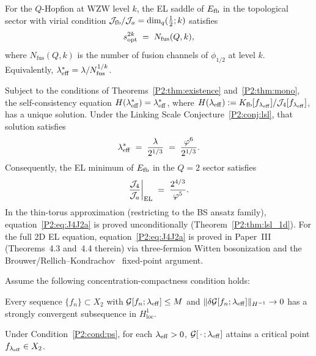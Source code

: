 \begin{conjecture}
\label{P1:conj:linking}
For the $Q$-Hopfion at WZW level $k$, the EL saddle of $E_{\mathrm{fb}}$
in the topological sector with virial condition
$\mathcal{J}_{\mathrm{fb}}/\mathcal{J}_a = \dim_q(\tfrac{1}{2};k)$ satisfies
\begin{equation}
  s_{\mathrm{opt}}^{2k} \;=\; N_{\mathrm{fus}}(Q,k),
  \label{P1:eq:lsc_p1}
\end{equation}
where $N_{\mathrm{fus}}(Q,k)$ is the number of fusion channels of
$\phi_{1/2}$ at level $k$.
Equivalently, $\lambda_{\mathrm{eff}}^* = \lambda/N_{\mathrm{fus}}^{1/k}$.
\end{conjecture}

\begin{theorem}
\label{P2:thm:main}
Subject to the conditions of Theorems~\ref{P2:thm:existence}
and~\ref{P2:thm:mono}, the self-consistency equation $H(\lambda_{\mathrm{eff}}^*)=\lambda_{\mathrm{eff}}^*$,
where $H(\lambda_{\mathrm{eff}}):=K_{\mathrm{fb}}[f_{\lambda_{\mathrm{eff}}}]/\mathcal{J}_4[f_{\lambda_{\mathrm{eff}}}]$, has a unique solution.
Under the Linking Scale Conjecture~\ref{P2:conj:lsl}, that solution satisfies
\begin{equation}
  \lambda_{\mathrm{eff}}^* \;=\; \frac{\lambda}{2^{1/3}} \;=\; \frac{\varphi^6}{2^{1/3}}.
  \label{P2:eq:leffstar}
\end{equation}
Consequently, the EL minimum of $E_{\mathrm{fb}}$ in the $Q=2$ sector satisfies
\begin{equation}
  \frac{\mathcal{J}_4}{\mathcal{J}_a}\bigg|_{\mathrm{EL}}
  \;=\; \frac{2^{4/3}}{\varphi^5}.
  \label{P2:eq:J4J2a}
\end{equation}
In the thin-torus approximation (restricting to the BS ansatz family),
equation~\eqref{P2:eq:J4J2a} is proved unconditionally
(Theorem~\ref{P2:thm:lsl_1d}).
For the full 2D EL equation, equation~\eqref{P2:eq:J4J2a} is proved
in Paper~III~\cite{Paper3} (Theorems~4.3 and~4.4 therein) via
three-fermion Witten bosonization and the Brouwer/Rellich--Kondrachov~\cite{Evans2010}
fixed-point argument.
\end{theorem}

\begin{theorem}
\label{P2:thm:existence}
Assume the following concentration-compactness condition holds:
\begin{condition}
\label{P2:cond:ps}
Every sequence $\{f_n\}\subset X_2$ with $\mathcal{G}[f_n;\lambda_{\mathrm{eff}}]\leq M$ and
$\|\delta\mathcal{G}[f_n;\lambda_{\mathrm{eff}}]\|_{H^{-1}}\to 0$ has a strongly convergent
subsequence in $H^1_{\mathrm{loc}}$.
\end{condition}
Under Condition~\ref{P2:cond:ps}, for each $\lambda_{\mathrm{eff}}>0$,
$\mathcal{G}[\,\cdot\,;\lambda_{\mathrm{eff}}]$ attains a critical point $f_{\lambda_{\mathrm{eff}}}\in X_2$.
\end{theorem}

